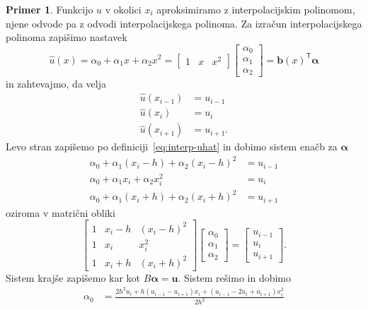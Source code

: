 \documentclass[12pt,a4paper,twoside]{article}
\theoremstyle{definition} %
\newtheorem{primer}[definicija]{Primer}
\theoremstyle{plain} %
\numberwithin{equation}{section}
\newcommand{\T}{\mathsf{T}}
\renewcommand{\b}{\boldsymbol}
\begin{document}
\begin{primer}
Funkcijo $u$ v okolici $x_i$ aproksimiramo z interpolacijskim polinomom, njene odvode pa z odvodi
interpolacijskega polinoma. Za izračun interpolacijskega polinoma zapišimo nastavek
\begin{equation}
  \label{eq:interp-uhat}
  \hat{u}(x) = \alpha_0 + \alpha_1x + \alpha_2x^2 =
  \begin{bmatrix}
    1 & x & x^2
  \end{bmatrix}
  \begin{bmatrix}
    \alpha_0 \\ \alpha_1 \\ \alpha_2
  \end{bmatrix} = \b{b}(x)^\T\b{\alpha}
\end{equation}
in zahtevajmo, da velja
\begin{align}
  \hat{u}(x_{i-1}) &= u_{i-1} \\
  \hat{u}(x_{i}) &= u_{i} \\
  \hat{u}(x_{i+1}) &= u_{i+1}.
\end{align}
Levo stran zapišemo po definiciji~\eqref{eq:interp-uhat} in dobimo
sistem enačb za $\b\alpha$
\begin{align}
  \alpha_0 + \alpha_1 (x_i -h) + \alpha_2 (x_i-h)^2 &= u_{i-1} \\
  \alpha_0 + \alpha_1 x_{i} + \alpha_2 x_{i}^2 &= u_{i} \\
  \alpha_0 + \alpha_1 (x_i +h) + \alpha_2 (x_i+h)^2 &= u_{i+1}
\end{align}
oziroma v matrični obliki
\begin{equation}
  \begin{bmatrix}
    1 & x_i - h & (x_i-h)^2 \\
    1 & x_i & x_i^2 \\
    1 & x_i + h & (x_i+h)^2
  \end{bmatrix}
  \begin{bmatrix}
    \alpha_0 \\ \alpha_1 \\ \alpha_2
  \end{bmatrix}
  =
  \begin{bmatrix}
    u_{i-1} \\ u_i  \\ u_{i+1}
  \end{bmatrix}.
\end{equation}
Sistem krajše zapišemo kar kot $B\b\alpha = \b{u}$. Sistem rešimo in dobimo
\begin{align}
  \alpha_0 &= \frac{2 h^2 u_{i}+h (u_{i-1}-u_{i+1}) x_i+(u_{i-1}-2 u_{i}+u_{i+1}) x_i^2}{2 h^2} \\

\end{align}
\end{primer}
\end{document}
